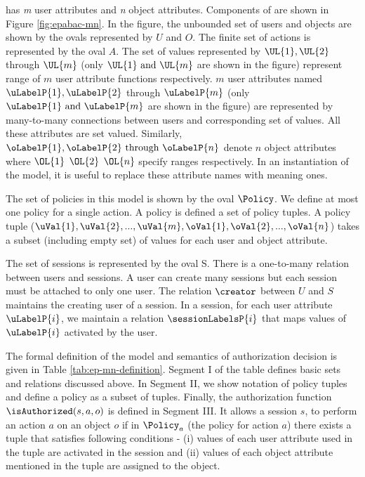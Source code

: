 %
\label{sec:epmodel}

%




\EPMNModel{} has \textit{m} user attributes and \textit{n} object attributes. Components of \EPMNModel{}  are shown in Figure \ref{fig:epabac-mn}.  In the figure, the unbounded set of users and objects are shown by the ovals represented by $U$ and $O$. The finite set of actions is represented by the oval $A$. The set of values represented by $\UL{1}, \UL{2}$ through $\UL{m}$ (only $\UL{1} \text{ and } \UL{m}$ are shown in the figure) represent range of $m$ user attribute functions respectively.  $m$ user attributes named $\uLabelP{1}, \uLabelP{2}$ through $\uLabelP{m}$ (only $\uLabelP{1} \text{ and } \uLabelP{m}$ are shown in the figure) are represented by many-to-many connections between users and  corresponding set of values. All these attributes are set valued. Similarly, $\oLabelP{1}, \oLabelP{2} \text{ through } \oLabelP{n}$ denote $n$ object attributes where $\OL{1}$ $\OL{2}$  $\OL{n}$ specify ranges respectively. In an instantiation of the model, it is useful to replace these  attribute names with meaning ones.




The set of policies in this model is shown by the oval $\Policy$. We define at most one policy for a single action. A policy is defined a set of policy tuples. A policy tuple  ($\uVal{1},\uVal{2}, ..., \uVal{m}, \oVal{1},\oVal{2}, ..., \oVal{n}$) takes a subset (including empty set) of values for each user and object attribute.




The set of sessions is represented by the oval S. There is a one-to-many relation between users and sessions. A user can create many sessions but each session must be attached to only one user. The relation $\creator$ between $U$ and $S$ maintains the creating user of a session. In a session, for each user attribute $\uLabelP{i}$, we maintain a relation $\sessionLabelsP{i}$ that maps values of $\uLabelP{i}$ activated by the user. 



The formal definition of the model and semantics of authorization  decision is given in Table \ref{tab:ep-mn-definition}. Segment I of the table defines basic sets and relations discussed above. In Segment II, we show notation of policy tuples and define a policy as a subset of tuples. Finally, the authorization function $\isAuthorized(s,a,o)$ is defined in Segment III.  It allows a session $s$, to perform an action $a$ on an object $o$ if in $\Policy_a$ (the policy for action $a$)  there exists a tuple that satisfies following conditions - (i) values of each user attribute used in the tuple are activated in the session and (ii) values of each object attribute mentioned in the tuple are assigned to  the object.


